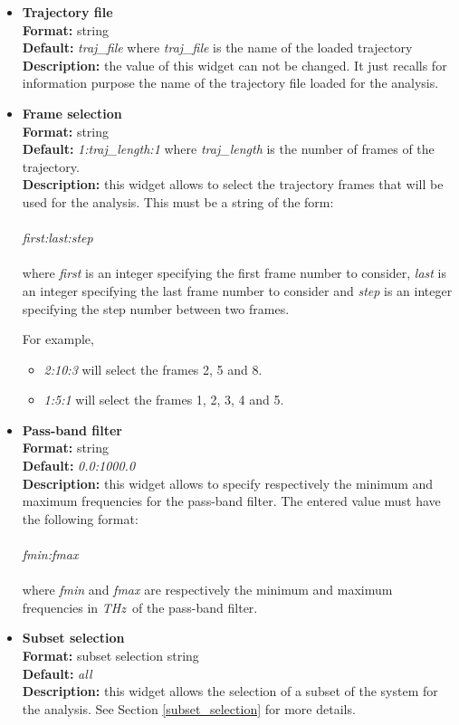 \documentclass[a4paper,11pt]{report}
\newcommand{\thz}{\textit{THz}}
\begin{document}
\begin{itemize}
\item \textbf{Trajectory file}\\
\textbf{Format:} string\\
\textbf{Default:} \textit{traj\_file} where \textit{traj\_file} is the name of the loaded trajectory\\
\textbf{Description:} the value of this widget can not be changed. It just recalls for information purpose the name
of the trajectory file loaded for the analysis.

\item \textbf{Frame selection}\\
\textbf{Format:} string\\
\textbf{Default:} \textit{1:traj\_length:1} where \textit{traj\_length} is the number of frames of the trajectory.\\
\textbf{Description:} this widget allows to select the trajectory frames that will be used for the analysis. This must
be a string of the form:
\\\\
\textit{first:last:step}
\\\\
where \textit{first} is an integer specifying the first frame number to consider, \textit{last} is an integer specifying the last 
frame number to consider and \textit{step} is an integer specifying the step number between two frames.

For example,
\begin{itemize}
\item \textit{2:10:3} will select the frames 2, 5 and 8.
\item \textit{1:5:1} will select the frames 1, 2, 3, 4 and 5.
\end{itemize}

\item \textbf{Pass-band filter}\\
\textbf{Format:} string\\
\textbf{Default:} \textit{0.0:1000.0}\\
\textbf{Description:} this widget allows to specify respectively the minimum and maximum frequencies for the pass-band filter. 
The entered value must have the following format:
\\\\
\textit{fmin:fmax}
\\\\
where \textit{fmin} and \textit{fmax} are respectively the minimum and maximum frequencies in \thz\ of the pass-band filter.
\newpage
\item \textbf{Subset selection}\\
\textbf{Format:} subset selection string\\
\textbf{Default:} \textit{all}\\
\textbf{Description:} this widget allows the selection of a subset of the system for the analysis. 
See Section \ref{subset_selection} for more details.


\end{itemize}
\end{document}
